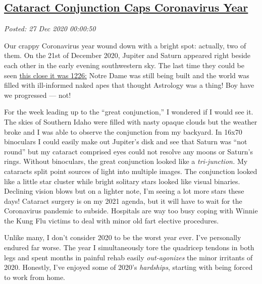 %

\subsection*{\href{http://analyzethedatanotthedrivel.org/2020/12/26/cataract-conjunction-caps-coronavirus-year/}{Cataract Conjunction Caps Coronavirus Year}}


\noindent\emph{Posted: 27 Dec 2020 00:00:50}
\vspace{6pt}

Our crappy Coronavirus year wound down with a bright spot: actually, two
of them. On the 21st of December 2020, Jupiter and Saturn appeared right
beside each other in the early evening southwestern sky. The last time
they could be seen
\href{https://astronomy.com/news/2020/12/jupiter-and-saturn-will-form-rare-christmas-star-on-winter-solstice}{this
close it was 1226:} Notre Dame was still being built and the world was
filled with ill-informed naked apes that thought Astrology was a thing!
Boy have we progressed --- not!

For the week leading up to the ``great conjunction,'' I wondered if I
would see it. The skies of Southern Idaho were filled with nasty opaque
clouds but the weather broke and I was able to observe the conjunction
from my backyard. In 16x70 binoculars I could easily make out Jupiter's
disk and see that Saturn was ``not round'' but my cataract
comprised eyes could not resolve any moons or Saturn's rings. Without
binoculars, the great conjunction looked like a \emph{tri-junction.} My
cataracts split point sources of light into multiple images. The
conjunction looked like a little star cluster while bright solitary
stars looked like visual binaries. Declining vision blows but on a
lighter note, I'm seeing a lot more stars these days! Cataract surgery
is on my 2021 agenda, but it will have to wait for the Coronavirus
pandemic to subside. Hospitals are way too busy coping with Winnie the
Kung Flu victims to deal with minor old fart elective procedures.

Unlike many, I don't consider 2020 to be the worst year ever. I've
personally endured far worse. The year I simultaneously tore the
quadricep tendons in both legs and spent months in painful rehab easily
\emph{out-agonizes} the minor irritants of 2020. Honestly, I've enjoyed
some of 2020's \emph{hardships}, starting with being forced to work from
home.


